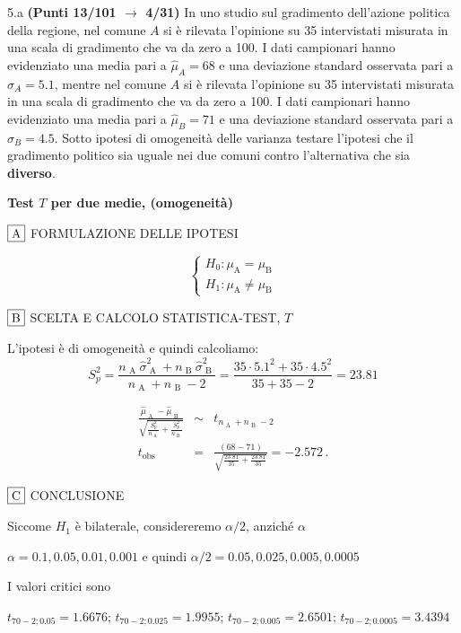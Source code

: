 \documentclass[
  11pt,
]{book}
\theoremstyle{mytheoremstyle}
\theoremstyle{mydefstyle}
\newenvironment{sol}
  {
  \begin{tcolorbox}[enhanced,breakable,arc=0.1mm,boxrule=1pt,colback=white,colframe=iblue,
  title=\bf \fontfamily{lmss}\selectfont \hspace{.5 cm} Soluzione,drop fuzzy shadow]

}{
\end{tcolorbox}
  }
\begin{document}
5.a \textbf{(Punti 13/101 \(\rightarrow\) 4/31)} In uno studio sul gradimento dell'azione politica della regione, nel comune \(A\) si è rilevata l'opinione su 35 intervistati misurata in una scala di gradimento che va da zero a 100. I dati campionari hanno evidenziato una media pari a \(\hat\mu_A=68\) e una deviazione standard osservata pari a \(\hat\sigma_A=5.1\), mentre nel comune \(A\) si è rilevata l'opinione su 35 intervistati misurata in una scala di gradimento che va da zero a 100. I dati campionari hanno evidenziato una media pari a \(\hat\mu_B=71\) e una deviazione standard osservata pari a \(\hat\sigma_B=4.5\). Sotto ipotesi di omogeneità delle varianza testare l'ipotesi che il gradimento politico sia uguale nei due comuni contro l'alternativa che sia \textbf{diverso}.

\begin{sol}
\textbf{Test \(T\) per due medie, (omogeneità)}

\(\fbox{A}\) FORMULAZIONE DELLE IPOTESI

\[\begin{cases}
   H_0: \mu_\text{A} = \mu_\text{B} \\
   H_1: \mu_\text{A} \neq \mu_\text{B} 
   \end{cases}\]

\(\fbox{B}\) SCELTA E CALCOLO STATISTICA-TEST, \(T\)

L'ipotesi è di omogeneità e quindi calcoliamo:\[
   S_p^2=\frac{n_\text{ A }\hat\sigma^2_\text{ A }+n_\text{ B }\hat\sigma^2_\text{ B }}{n_\text{ A }+n_\text{ B }-2} =
   \frac{ 35 \cdot 5.1 ^2+ 35 \cdot 4.5 ^2}{ 35 + 35 -2}= 23.81 
  \]

\begin{eqnarray*}
  \frac{\hat\mu_\text{ A } - \hat\mu_\text{ B }}
  {\sqrt{\frac {S^2_p}{n_\text{ A }}+\frac {S^2_p}{n_\text{ B }}}}&\sim&t_{n_\text{ A }+n_\text{ B }-2}\\
  t_{\text{obs}}
  &=& \frac{ ( 68 -  71 )} {\sqrt{\frac{ 23.81 }{ 35 }+\frac{ 23.81 }{ 35 }}}
  =   -2.572 \, .
  \end{eqnarray*}

\(\fbox{C}\) CONCLUSIONE

Siccome \(H_1\) è bilaterale, considereremo \(\alpha/2\),
anziché \(\alpha\)

\(\alpha=0.1, 0.05, 0.01, 0.001\) e quindi \(\alpha/2=0.05, 0.025, 0.005, 0.0005\)

I valori critici sono

\(t_{70-2;0.05}=1.6676\); \(t_{70-2;0.025}=1.9955\); \(t_{70-2;0.005}=2.6501\); \(t_{70-2;0.0005}=3.4394\)


\end{sol}
\end{document}
